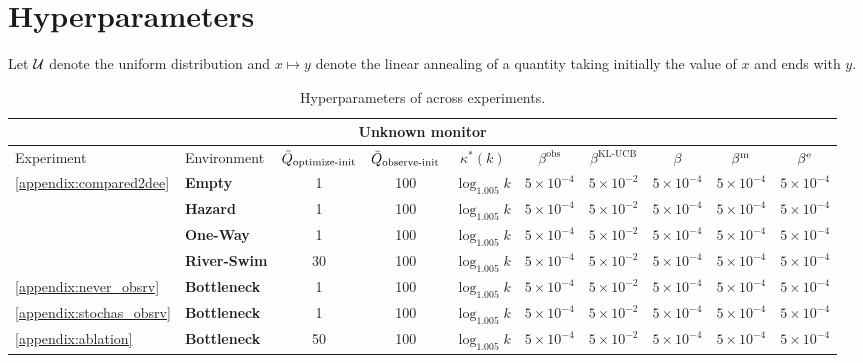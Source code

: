    \section{Hyperparameters} 
   \label{appendix:hyperparameters}
   Let $\mathcal{U}$ denote the uniform distribution and $x \mapsto y$ denote the linear annealing of a quantity taking initially the value of $x$ and ends with $y$.
    \begin{table}[tbh]
    \caption{Hyperparameters of \thealgo across experiments.}
    \scriptsize
    \hskip0.25in
    \begin{tabular}{ |m{6em} m{6em} c c c c c c c c| }     

    \hline
    \multicolumn{10}{|c|}{Unknown monitor} \\
    \hline
    Experiment & Environment & $\bar{Q}_{\text{optimize-init}}$ & $\bar{Q}_{\text{observe-init}}$ & $\kappa^{*}(k)$ & $\beta^{\text{obs}}$ & $\beta^{\text{KL-UCB}}$ & $\beta$ & $\beta^\text{m}$ & $\beta^\text{e}$\\
    \hline
    \multirow{4}{6em}{\cref{appendix:compared2dee}} & \textbf{Empty} & 1 & 100 & $\log_{1.005}k$ & $5 \times 10^{-4}$ & $5 \times 10^{-2}$ & $5 \times 10^{-4}$ & $5 \times 10^{-4}$ & $5 \times 10^{-4}$\\ 
    & \textbf{Hazard} & 1 & 100 & $\log_{1.005}k$ & $5 \times 10^{-4}$ & $5 \times 10^{-2}$ & $5 \times 10^{-4}$ & $5 \times 10^{-4}$ & $5 \times 10^{-4}$\\ 
    & \textbf{One-Way} & 1 & 100 & $\log_{1.005}k$ & $5 \times 10^{-4}$ & $5 \times 10^{-2}$ & $5 \times 10^{-4}$ & $5 \times 10^{-4}$ & $5 \times 10^{-4}$\\
    & \textbf{River-Swim} & 30 & 100 & $\log_{1.005}k$ & $5 \times 10^{-4}$ & $5 \times 10^{-2}$ & $5 \times 10^{-4}$ & $5 \times 10^{-4}$ & $5 \times 10^{-4}$\\
    \hline
    \multirow{1}{6em}{\cref{appendix:never_obsrv}} & \textbf{Bottleneck} & 1 & 100 & $\log_{1.005}k$ & $5 \times 10^{-4}$ & $5 \times 10^{-2}$ & $5 \times 10^{-4}$ & $5 \times 10^{-4}$ & $5 \times 10^{-4}$\\ 
    \hline
    \multirow{1}{6em}{\cref{appendix:stochas_obsrv}} & \textbf{Bottleneck} & 1 & 100 & $\log_{1.005}k$ & $5 \times 10^{-4}$ & $5 \times 10^{-2}$ & $5 \times 10^{-4}$ & $5 \times 10^{-4}$ & $5 \times 10^{-4}$\\ 
    \hline
    \multirow{1}{6em}{\cref{appendix:ablation}} & \textbf{Bottleneck} & 50 & 100 & $\log_{1.005}k$ & $5 \times 10^{-4}$ & $5 \times 10^{-2}$ & $5 \times 10^{-4}$ & $5 \times 10^{-4}$ & $5 \times 10^{-4}$\\ 

\end{tabular}
\end{table}

